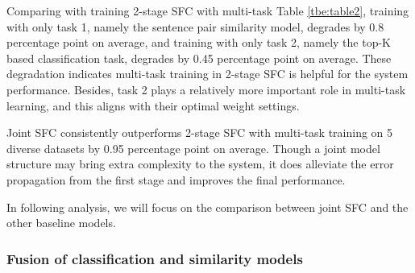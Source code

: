 \begin{table}
  \begin{centering}
    \par
  \end{centering}
  \caption{The average classification accuracy in percentage in stage 1 on the first five datasets.}
  \label{tbe:top1_5_accuracy}
\end{table}

Comparing with training 2-stage SFC with multi-task Table \ref{tbe:table2}, training with only task 1, namely the sentence pair similarity model, degrades by 0.8 percentage point on average, and training with only task 2, namely the top-K based classification task, degrades by 0.45 percentage point on average. 
These degradation indicates multi-task training in 2-stage SFC is helpful for the system performance. Besides, task 2 plays a relatively more important role in multi-task learning, and this aligns with their optimal weight settings.

Joint SFC consistently outperforms 2-stage SFC with multi-task training on 5 diverse datasets by 0.95 percentage point on average. 
Though a joint model structure may bring extra complexity to the system, it does alleviate the error propagation from the first stage and improves the final performance.

In following analysis, we will focus on the comparison between joint SFC and the other baseline models.

\subsubsection*{Fusion of classification and similarity models} 

